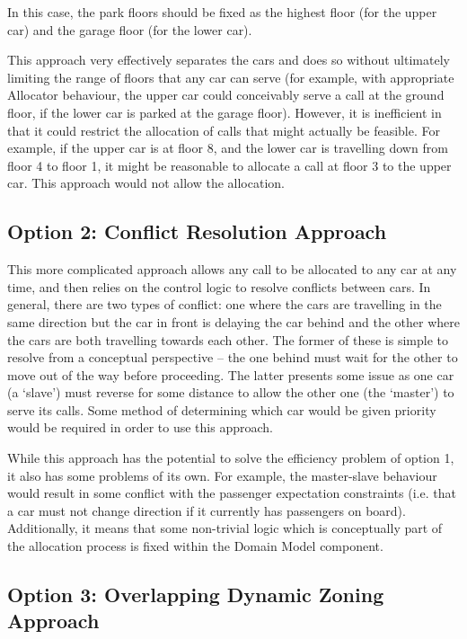 \documentclass{UoYCSproject}
\begin{document}
In this case, the park floors should be fixed as the highest floor (for the upper car) and the garage floor (for the lower car).

This approach very effectively separates the cars and does so without ultimately limiting the range of floors that any car can serve (for example, with appropriate Allocator behaviour, the upper car could conceivably serve a call at the ground floor, if the lower car is parked at the garage floor).  However, it is inefficient in that it could restrict the allocation of calls that might actually be feasible.  For example, if the upper car is at floor 8, and the lower car is travelling down from floor 4 to floor 1, it might be reasonable to allocate a call at floor 3 to the upper car.  This approach would not allow the allocation.

\subsection{Option 2: Conflict Resolution Approach}

This more complicated approach allows any call to be allocated to any car at any time, and then relies on the control logic to resolve conflicts between cars.  In general, there are two types of conflict: one where the cars are travelling in the same direction but the car in front is delaying the car behind and the other where the cars are both travelling towards each other.  The former of these is simple to resolve from a conceptual perspective – the one behind must wait for the other to move out of the way before proceeding.  The latter presents some issue as one car (a `slave') must reverse for some distance to allow the other one (the `master') to serve its calls.  Some method of determining which car would be given priority would be required in order to use this approach.

While this approach has the potential to solve the efficiency problem of option 1, it also has some problems of its own.  For example, the master-slave behaviour would result in some conflict with the passenger expectation constraints (i.e. that a car must not change direction if it currently has passengers on board).  Additionally, it means that some non-trivial logic which is conceptually part of the allocation process is fixed within the Domain Model component.

\subsection{Option 3: Overlapping Dynamic Zoning Approach}
\end{document}

